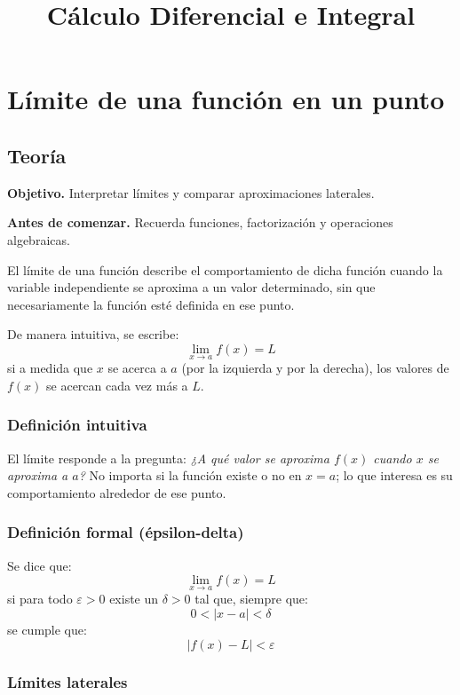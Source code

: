 \documentclass[12pt]{article}
\title{Cálculo Diferencial e Integral}
\author{}
\date{}
\begin{document}
\maketitle

\section{Límite de una función en un punto}

\subsection{Teoría}

\textbf{Objetivo.} Interpretar límites y comparar aproximaciones laterales.

\textbf{Antes de comenzar.} Recuerda funciones, factorización y operaciones algebraicas.


El límite de una función describe el comportamiento de dicha función cuando la variable independiente se aproxima a un valor determinado, sin que necesariamente la función esté definida en ese punto.

De manera intuitiva, se escribe:
\[
\lim_{x \to a} f(x) = L
\]
si a medida que $x$ se acerca a $a$ (por la izquierda y por la derecha), los valores de $f(x)$ se acercan cada vez más a $L$.



\subsubsection{Definición intuitiva}


El límite responde a la pregunta: \textit{¿A qué valor se aproxima $f(x)$ cuando $x$ se aproxima a $a$?} No importa si la función existe o no en $x = a$; lo que interesa es su comportamiento alrededor de ese punto.



\subsubsection{Definición formal (épsilon-delta)}


Se dice que:
\[
\lim_{x \to a} f(x) = L
\]
si para todo $\varepsilon > 0$ existe un $\delta > 0$ tal que, siempre que:
\[
0 < |x - a| < \delta
\]
se cumple que:
\[
|f(x) - L| < \varepsilon
\]



\subsubsection{Límites laterales}
\end{document}
